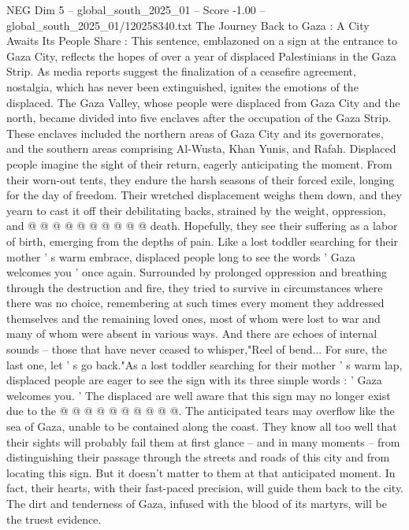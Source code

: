 \begin{textsample}{NEG Dim 5 – global\_south\_2025\_01 – Score -1.00 – global\_south\_2025\_01/120258340.txt}  \label{ex:f5_neg_104}
The Journey Back to Gaza : A City Awaits Its People Share : This sentence, emblazoned on a sign at the entrance to Gaza City, reflects the hopes of over a year of displaced Palestinians in the Gaza Strip.
As media reports suggest the finalization of a ceasefire agreement, nostalgia, which has never been extinguished, ignites the emotions of the displaced.
The Gaza Valley, whose people were displaced from Gaza City and the north, became divided into five enclaves after the occupation of the Gaza Strip.
These enclaves included the northern areas of Gaza City and its governorates, and the southern areas comprising Al-Wusta, Khan Yunis, and Rafah.
Displaced people imagine the sight of their return, eagerly anticipating the moment.
From their worn-out tents, they endure the harsh seasons of their forced exile, longing for the day of freedom.
Their wretched displacement weighs them down, and they yearn to cast it off their debilitating backs, strained by the weight, oppression, and @ @ @ @ @ @ @ @ @ @ death.
Hopefully, they see their suffering as a labor of birth, emerging from the depths of pain.
Like a lost toddler searching for their mother ' s warm embrace, displaced people long to see the words ' Gaza welcomes you ' once again.
Surrounded by prolonged oppression and breathing through the destruction and fire, they tried to survive in circumstances where there was no choice, remembering at such times every moment they addressed themselves and the remaining loved ones, most of whom were lost to war and many of whom were absent in various ways.
And there are echoes of internal sounds -- those that have never ceased to whisper,"Reel of bend...
For sure, the last one, let ' s go back."As a lost toddler searching for their mother ' s warm lap, displaced people are eager to see the sign with its three simple words : ' Gaza welcomes you. ' The displaced are well aware that this sign may no longer exist due to the @ @ @ @ @ @ @ @ @ @.
The anticipated tears may overflow like the sea of Gaza, unable to be contained along the coast.
They know all too well that their sights will probably fail them at first glance -- and in many moments -- from distinguishing their passage through the streets and roads of this city and from locating this sign.
But it doesn't matter to them at that anticipated moment.
In fact, their hearts, with their fast-paced precision, will guide them back to the city.
The dirt and tenderness of Gaza, infused with the blood of its martyrs, will be the truest evidence.

\end{textsample}
